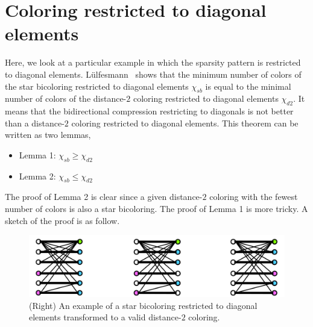 \documentclass[12pt, twoside,a4paper,toc=bibliography]{scrbook}
\begin{document}
\clearpage
\section{Coloring restricted to diagonal elements}
\label{s.part.color.diag}
Here, we look at a particular example in which the sparsity pattern is restricted to diagonal elements.
Lülfesmann~\cite{Lulfesmann2012Fap} shows that the minimum number of colors of
the star bicoloring restricted to diagonal elements $\chi_{sb}$ is equal to
the minimal number of colors of the distance-$2$ coloring restricted
to diagonal elements $\chi_{d2}$.
It means that the bidirectional compression restricting to diagonals is not better than
a distance-$2$ coloring restricted to diagonal elements.
This theorem can be written as two lemmas,
\begin{itemize}
\item Lemma 1: $\chi_{sb} \geq \chi_{d2}$
\item Lemma 2: $\chi_{sb} \leq \chi_{d2}$
\end{itemize}
The proof of Lemma 2 is clear since
a given distance-$2$ coloring with the fewest number of colors is also a star bicoloring.
The proof of Lemma 1 is more tricky. A sketch of the proof is as follow.
\begin{figure}
\includegraphics[width=\linewidth]{proof1.png}
\caption{
(Right) An example of a star bicoloring restricted to diagonal elements
transformed to a valid distance-$2$ coloring.}
\label{proof1}
\end{figure}
\end{document}
